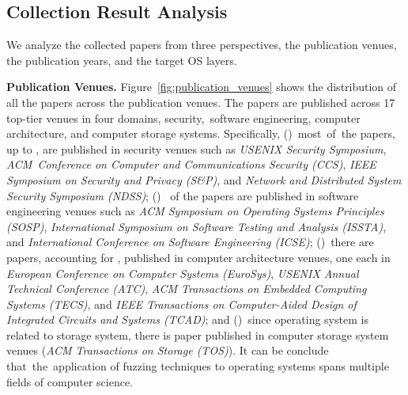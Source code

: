 \subsection{Collection Result Analysis}\label{Results Analysis}

We analyze the collected papers from three perspectives, \ie the publication venues, the publication years, and the target OS layers. 

\textbf{Publication Venues.} Figure~\ref{fig:publication_venues} shows the distribution of all the papers across the publication venues. The  papers are published across 17 top-tier venues in four domains, \ie security,~software engineering, computer architecture, and computer storage systems. Specifically, ()~most~of~the papers, up to , are published in security venues such as \emph{USENIX Security Symposium}, \emph{ACM~Conference on Computer and Communications Security (CCS)}, \emph{IEEE Symposium on Security and Privacy (S\&P)}, and \emph{Network and Distributed System Security Symposium (NDSS)}; ()~ of the papers are published in software engineering venues such as \emph{ACM Symposium on Operating Systems Principles (SOSP)}, \emph{International Symposium on Software Testing and Analysis (ISSTA)}, and \emph{International Conference on Software Engineering (ICSE)}; ()~there are  papers, accounting for , published in computer architecture venues, one each in \emph{European Conference on Computer Systems (EuroSys)}, \emph{USENIX Annual Technical Conference (ATC)}, \emph{ACM Transactions on Embedded Computing Systems (TECS)}, and \emph{IEEE Transactions on Computer-Aided Design of Integrated Circuits and Systems (TCAD)}; and ()~since operating system is related to storage system, there is  paper published in computer storage system venues (\ie \emph{ACM Transactions on Storage (TOS)}). It can be conclude that~the~application of fuzzing techniques to operating systems spans multiple fields of computer science.

